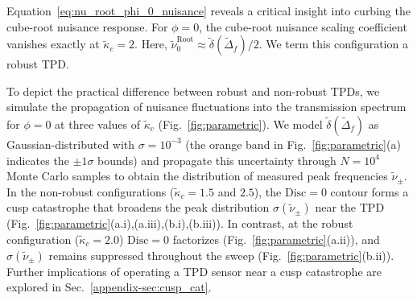 \documentclass[%
  reprint,
  amsmath,amssymb,
  aps,
  prapplied,
  superscriptaddress,
  longbibliography]{revtex4-2}
\begin{document}
Equation~\ref{eq:nu_root_phi_0_nuisance} reveals a critical insight into curbing the cube-root nuisance response. For $\phi = 0$, the cube-root nuisance scaling coefficient vanishes exactly at $\tilde{\kappa}_c = 2$. Here, $\tilde{\nu}_0^\text{Root} \approx \tilde{\delta}(\tilde{\Delta}_f)/2$. We term this configuration a robust TPD.

To depict the practical difference between robust and non-robust TPDs, we simulate the propagation of nuisance fluctuations into the transmission spectrum for $\phi = 0$ at three values of $\tilde{\kappa}_c$ (Fig.~\ref{fig:parametric}). We model $\tilde{\delta}(\tilde{\Delta}_f)$ as Gaussian-distributed with $\sigma = 10^{-3}$ (the orange band in Fig.~\ref{fig:parametric}(a) indicates the $\pm 1\sigma$ bounds) and propagate this uncertainty through $N = 10^4$ Monte Carlo samples to obtain the distribution of measured peak frequencies $\tilde{\nu}_\pm$. In the non-robust configurations ($\tilde{\kappa}_c = 1.5$ and $2.5$), the $\mathrm{Disc} = 0$ contour forms a cusp catastrophe \cite{arnold_catastrophe_1992} that broadens the peak distribution $\sigma(\tilde{\nu}_\pm)$ near the TPD (Fig.~\ref{fig:parametric}(a.i),(a.iii),(b.i),(b.iii)). In contrast, at the robust configuration ($\tilde{\kappa}_c = 2.0$) $\mathrm{Disc} = 0$ factorizes (Fig.~\ref{fig:parametric}(a.ii)), and $\sigma(\tilde{\nu}_\pm)$ remains suppressed throughout the sweep (Fig.~\ref{fig:parametric}(b.ii)). Further implications of operating a TPD sensor near a cusp catastrophe are explored in Sec.~\ref{appendix-sec:cusp_cat}. 
\end{document}
